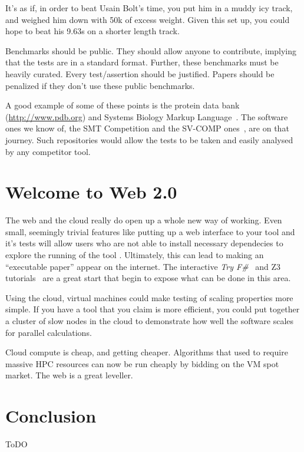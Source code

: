 \documentclass[conference]{IEEEtran}
\begin{document}
It's as if, in order to beat Usain Bolt's time, you put him in a muddy
icy track, and weighed him down with 50k of excess weight. Given this
set up, you could hope to beat his 9.63s on a shorter length track.

Benchmarks should be public. They should allow anyone to contribute,
implying that the tests are in a standard format. Further, these
benchmarks must be heavily curated. Every test/assertion should be
justified. Papers should be penalized if they don't use these public
benchmarks.

A good example of some of these points is the protein data bank
(\url{http://www.pdb.org}) and Systems Biology Markup
Language~\cite{Hucka2003,Chaouiya2013}. The software ones we know of,
the SMT Competition and the SV-COMP ones~\cite{SMTComp2014,
  SVCOMP2015}, are on that journey. Such repositories would
allow the tests to be taken and easily analysed by any competitor
tool.

\section{Welcome to Web 2.0} 

The web and the cloud really do open up a whole new way of
working. Even small, seemingly trivial features like putting up a web
interface to your tool and it's tests will allow users who are not
able to install necessary dependecies to explore the running of the
tool \cite{Hall2014}. Ultimately, this can lead to making an
``executable paper'' appear on the internet. The interactive {\em Try
  F\#}~\cite{tryFsharp} and Z3 tutorials~\cite{Z3tutorial} are a great
start that begin to expose what can be done in this area.

Using the cloud, virtual machines could make testing of scaling
properties more simple.  If you have a tool that you claim is more
efficient, you could put together a cluster of slow nodes in the cloud
to demonstrate how well the software scales for parallel calculations.

Cloud compute is cheap, and getting cheaper. Algorithms that used to
require massive HPC resources can now be run cheaply by bidding on
the VM spot market. The web is a great leveller. 


\section{Conclusion}
\label{sec:Conclusion} 

ToDO 
\end{document}
